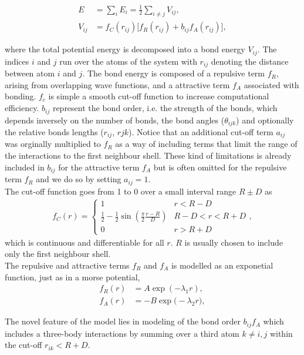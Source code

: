 \begin{align*}
  E &= \sum_i E_i = \frac{1}{2}\sum_{i \ne j} V_{ij}, \\
  V_{ij} &= f_C(r_{ij}) \big[f_R(r_{ij}) + b_{ij}f_A(r_{ij})  \big],
\end{align*}

where the total potential energy is decomposed into a bond energy $V_{ij}$. The indices $i$ and $j$ run over the atoms of the system with $r_{ij}$ denoting the distance between atom $i$ and $j$. The bond energy is composed of a repulsive term $f_R$, arising from overlapping wave functions, and a attractive term $f_A$ associated with bonding. $f_c$ is simple a smooth cut-off function to increase computational efficiency. $b_{ij}$ represent the bond order, i.e. the strength of the bonds, which depends inversely on the number of bonds, the bond angles ($\theta_{ijk}$) and optionally the relative bonds lengths ($r_{ij}$, $r{jk}$). Notice that an additional cut-off term $a_{ij}$ was orginally multiplied to $f_R$ as a way of including terms that limit the range of the interactions to the first neighbour shell. These kind of limitations is already included in $b_{ij}$ for the attractive term $f_A$ but is often omitted for the repulsive term $f_R$ and we do so by setting $a_{ij} = 1$. \\
The cut-off function goes from 1 to 0 over a small interval range $R \pm D$ as
\begin{align*}
  f_C(r) =
  \begin{cases}
    1 & r < R - D \\
    \frac{1}{2} - \frac{1}{2} \sin{(\frac{\pi}{2} \frac{r - R}{D})} & R - D < r < R + D\\
    0 & r > R + D
  \end{cases},
\end{align*}
which is continuous and differentiable for all $r$. $R$ is usually chosen to include only the first neighbour shell. \\
The repulsive and attractive terms $f_R$ and $f_A$ is modelled as an exponetial function, just as in a morse potential, 
\begin{align*}
 f_R(r) &= A \exp(-\lambda_1 r), \\
 f_A(r) &= -B \exp \big(-\lambda_2 r\big),
\end{align*}


The novel feature of the model lies in modeling of the bond order $b_{ij}f_A$ which includes a three-body interactions by summing over a third atom $k \ne i,j$ within the cut-off $r_{ik} < R + D$.


